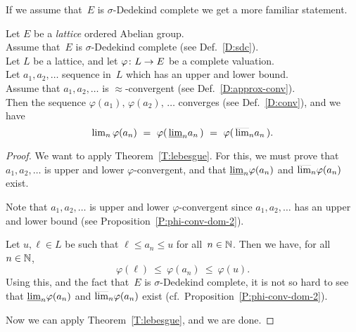 \documentclass[main.tex]{subfiles}
\begin{document}
%
%
\noindent
If we assume that~$E$ is $\sigma$-Dedekind complete 
we get a  more familiar statement.
\begin{thm}
\label{T:lebesgue_sdc}
Let $E$ be a \emph{lattice} ordered Abelian group.\\
Assume that~$E$ is $\sigma$-Dedekind complete (see Def.~\ref{D:sdc}).\\
Let $L$ be a lattice,
and let $\varphi\colon L \rightarrow E$ be a 
complete valuation.\\
Let $a_1,a_2,\dotsc$
sequence in~$L$
which has an upper and lower bound.\\
Assume that $a_1,a_2,\dotsc$ is $\approx$-convergent
(see Def.~\ref{D:approx-conv}). \\
Then 
the sequence $\varphi(a_1),\,\varphi(a_2),\,\dotsc$
converges (see Def.~\ref{D:conv}), and we have
\begin{equation*}
{\lim}_n \,\varphi(a_n)
\ =\ 
\varphi(\,\llim{n} a_n\,)
\ =\ 
\varphi(\,\ulim{n} a_n\,).
\end{equation*}
\end{thm}
\begin{proof}
We want to apply Theorem~\ref{T:lebesgue}.
For this, we must prove that $a_1,a_2,\dotsc$
is upper and lower $\varphi$-convergent,
and that $\smash{\underline{\lim}_{n}}\varphi(a_n)$
and $\smash{\overline{\lim}_{n}}\varphi(a_n)$ exist.

Note that $a_1,a_2,\dotsc$
is upper and lower $\varphi$-convergent
since $a_1,a_2,\dotsc$
has an upper and lower bound
(see Proposition~\ref{P:phi-conv-dom-2}).

Let $u,\ell\in L$
be such that $\ell\leq a_n \leq u$
for all~$n\in \mathbb{N}$.
Then we have, for all~$n\in \mathbb{N}$,
\begin{equation*}
\varphi(\ell) \ \leq\ \varphi(a_n) \ \leq\ \varphi(u).
\end{equation*}
Using this,
and the fact that~$E$ is $\sigma$-Dedekind complete,
it is not so hard to see
that $\smash{\underline{\lim}_{n}}\varphi(a_n)$
and $\smash{\overline{\lim}_{n}}\varphi(a_n)$ exist
 (cf.~Proposition~\ref{P:phi-conv-dom-2}).

Now we can apply Theorem~\ref{T:lebesgue},
and we are done.
\end{proof}
\end{document}
